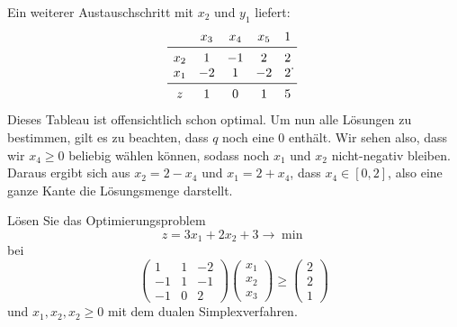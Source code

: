 \begin{solution}
        Ein weiterer Austauschschritt mit $x_2$ und $y_1$ liefert:
        $$
        \begin{matrix}
            & x_3 & x_4 & x_5 & 1\\
            \midrule
            x_2 & 1 & -1 & 2 & 2\\
            x_1 & -2 & 1 & -2 & 2\\
            \midrule
            z & 1 & 0 & 1 & 5
        \end{matrix}.
        $$
        Dieses Tableau ist offensichtlich schon optimal.
        Um nun alle Lösungen zu bestimmen, gilt es zu beachten, dass $q$ noch eine $0$ enthält.
        Wir sehen also, dass wir $x_4\geq 0$ beliebig wählen können, sodass noch $x_1$ und $x_2$ nicht-negativ bleiben. Daraus ergibt sich aus $x_2=2-x_4$ und $x_1=2+x_4$, dass $x_4\in[0,2]$, also eine ganze Kante die Lösungsmenge darstellt.
    \end{solution}

    \begin{exercise}
        Lösen Sie das Optimierungsproblem
        $$
        z = 3x_1 + 2x_2 + 3 \to \min
        $$
        bei
        $$
        \begin{pmatrix}
            1 & 1 & -2\\
            -1 & 1 & -1\\
            -1 & 0 & 2
        \end{pmatrix}
        \begin{pmatrix}
            x_1\\
            x_2\\
            x_3
        \end{pmatrix}
        \geq
        \begin{pmatrix}
            2\\
            2\\
            1
        \end{pmatrix}
        $$
        und $x_1,x_2,x_2\geq 0$ mit dem dualen Simplexverfahren.
    \end{exercise}

